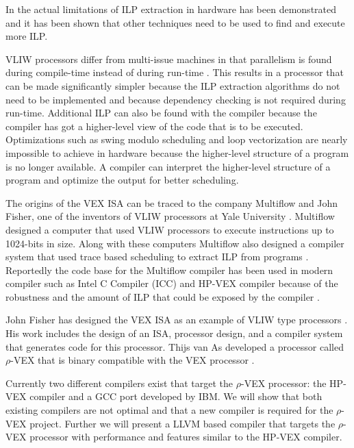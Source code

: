 In \cite{Wall:1993xy} the actual limitations of ILP extraction in hardware has been demonstrated and it has been shown that other techniques need to be used to find and execute more ILP.

VLIW processors differ from multi-issue machines in that parallelism is found during compile-time instead of during run-time \cite{Lam:1988:SPE:960116.54022} \cite{Dinechin:2004vn}. This results in a processor that can be made significantly simpler because the ILP extraction algorithms do not need to be implemented and because dependency checking is not required during run-time. Additional ILP can also be found with the compiler because the compiler has got a higher-level view of the code that is to be executed. Optimizations such as swing modulo scheduling and loop vectorization are nearly impossible to achieve in hardware because the higher-level structure of a program is no longer available. A compiler can interpret the higher-level structure of a program and optimize the output for better scheduling.

The origins of the VEX ISA can be traced to the company Multiflow and John Fisher, one of the inventors of VLIW processors at Yale University \cite{Fisher:1983:VLI:1067651.801649}. Multiflow designed a computer that used VLIW processors to execute instructions up to 1024-bits in size. Along with these computers Multiflow also designed a compiler system that used trace based scheduling to extract ILP from programs \cite{2247}. Reportedly the code base for the Multiflow compiler has been used in modern compiler such as Intel C Compiler (ICC) and HP-VEX compiler because of the robustness and the amount of ILP that could be exposed by the compiler \cite{Lowney:1993qy}.

John Fisher has designed the VEX ISA as an example of VLIW type processors \cite{Joseph-A.-Fisher:2005cr}. His work includes the design of an ISA, processor design, and a compiler system that generates code for this processor. Thijs van As developed a processor called $\rho$-VEX that is binary compatible with the VEX processor \cite{As:2008rt}.

Currently two different compilers exist that target the $\rho$-VEX processor: the HP-VEX compiler \cite{HP-VEX:2014} and a GCC port developed by IBM. We will show that both existing compilers are not optimal and that a new compiler is required for the $\rho$-VEX project. Further we will present a LLVM based compiler that targets the $\rho$-VEX processor with performance and features similar to the HP-VEX compiler. 

